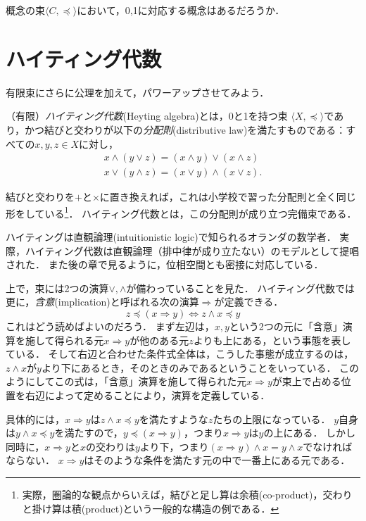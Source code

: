\documentclass[11pt,a4paper]{jsarticle}
\begin{document}
\begin{exercise}
概念の束$\langle C, \preceq \rangle$において，0,1に対応する概念はあるだろうか．
\end{exercise}



\section{ハイティング代数}

有限束にさらに公理を加えて，パワーアップさせてみよう．

\begin{dfn}[ハイティング代数]
（有限）\emph{ハイティング代数}(Heyting algebra)とは，0と1を持つ束 $\langle X, \preceq \rangle$であり，かつ結びと交わりが以下の\emph{分配則}(distributive law)を満たすものである：すべての$x, y, z \in X$に対し，
\begin{align}
 x \wedge (y \vee z) = (x \wedge y) \vee (x \wedge z) \\
 x \vee (y \wedge z) = (x \vee y) \wedge (x \vee z) .
\end{align}
\end{dfn}

結びと交わりを$+$と$\times$に置き換えれば，これは小学校で習った分配則と全く同じ形をしている\footnote{実際，圏論的な観点からいえば，結びと足し算は余積(co-product)，交わりと掛け算は積(product)という一般的な構造の例である．}．
ハイティング代数とは，この分配則が成り立つ完備束である．

ハイティングは直観論理(intuitionistic logic)で知られるオランダの数学者．
実際，ハイティング代数は直観論理（排中律が成り立たない）のモデルとして提唱された．
また後の章で見るように，位相空間とも密接に対応している．

上で，束には2つの演算$\vee, \wedge$が備わっていることを見た．
ハイティング代数では更に，\emph{含意}(implication)と呼ばれる次の演算$\Rightarrow$が定義できる．
\[
 z \preceq (x \Rightarrow y) \iff z \wedge x \preceq y
\]
これはどう読めばよいのだろう．
まず左辺は，$x, y$という2つの元に「含意」演算を施して得られる元$x \Rightarrow y$が他のある元$z$よりも上にある，という事態を表している．
そして右辺と合わせた条件式全体は，こうした事態が成立するのは，$z \wedge x$が$y$より下にあるとき，そのときのみであるということをいっている．
このようにしてこの式は，「含意」演算を施して得られた元$x \Rightarrow y$が束上で占める位置を右辺によって定めることにより，演算を定義している．

具体的には，$x \Rightarrow y$は$z \wedge x \preceq y$を満たすような$z$たちの上限になっている．
$y$自身は$y \wedge x \preceq y$を満たすので，$y \preceq (x \Rightarrow y)$，つまり$x \Rightarrow y$は$y$の上にある．
しかし同時に，$x \Rightarrow y$と$x$の交わりは$y$より下，つまり$(x \Rightarrow y) \wedge x = y \wedge x$でなければならない．
$x \Rightarrow y$はそのような条件を満たす元の中で一番上にある元である．
\end{document}
